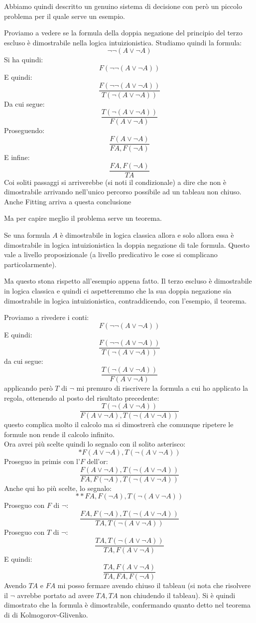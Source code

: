 \documentclass[a4paper,12pt, oneside]{book}
\begin{document}
Abbiamo quindi descritto un genuino sistema di decisione con però un piccolo
problema per il quale serve un esempio. 
\begin{esempio}
  Proviamo a vedere se la formula della doppia negazione del principio del terzo
  escluso è dimostrabile nella logica intuizionistica. Studiamo quindi la
  formula: 
  \[\neg\neg(A\lor \neg A)\]
  Si ha quindi:
  \[F(\neg\neg(A\lor \neg A))\]
  E quindi:
  \[\frac{F(\neg\neg(A\lor \neg A))}{T(\neg (A\lor \neg A))}\]
  Da cui segue:
  \[\frac{T(\neg (A\lor \neg A))}{F(A\lor \neg A)}\]
  Proseguendo:
  \[\frac{F(A\lor \neg A)}{FA, F(\neg A)}\]
  E infine:
  \[\frac{FA, F(\neg A)}{TA}\]
  Coi soliti passaggi si arriverebbe (si noti il condizionale) a dire che non è
  dimostrabile arrivando nell'unico percorso possibile ad un tableau non
  chiuso. \\
  Anche Fitting arriva a questa conclusione
\end{esempio}
Ma per capire meglio il problema serve un teorema.
\begin{teorema}
  Se una formula $A$ è dimostrabile in logica classica allora e solo allora essa
  è dimostrabile in logica intuizionistica la doppia negazione di tale
  formula. Questo vale a livello proposizionale (a livello predicativo le cose
  si complicano particolarmente). 
\end{teorema}
Ma questo stona rispetto all'esempio appena fatto. Il terzo escluso è
dimostrabile in logica classica e quindi ci aspetteremmo che la sua doppia
negazione sia dimostrabile in logica intuizionistica, contraddicendo, con
l'esempio, il teorema.
\begin{esempio}
  Proviamo a rivedere i conti:
  \[F(\neg\neg(A\lor \neg A))\]
  E quindi:
  \[\frac{F(\neg\neg(A\lor \neg A))}{T(\neg (A\lor \neg A))}\]
  da cui segue:
  \[\frac{T(\neg (A\lor \neg A))}{F(A\lor \neg A)}\]
  applicando però $T$ di $\neg$ mi premuro di riscrivere la formula a cui ho
  applicato la regola, ottenendo al posto del risultato precedente:
  \[\frac{T(\neg (A\lor \neg A))}{F(A\lor \neg A), T(\neg (A\lor \neg A))}\]
  questo complica molto il calcolo ma si dimostrerà che comunque ripetere le
  formule non rende il calcolo infinito.\\
  Ora avrei più scelte quindi lo segnalo con il solito asterisco:
  \[*F(A\lor \neg A), T(\neg (A\lor \neg A))\]
  Proseguo in primis con l'$F$ dell'or:
  \[\frac{F(A\lor \neg A), T(\neg (A\lor \neg A))}{FA, F(\neg A), T(\neg (A\lor
      \neg A))}\]
  Anche qui ho più scelte, lo segnalo:
  \[**FA, F(\neg A), T(\neg (A\lor\neg A))\]
  Proseguo con $F$ di $\neg$:
  \[\frac{FA, F(\neg A), T(\neg (A\lor\neg A))}{TA, T(\neg (A\lor\neg A))}\]
  Proseguo con $T$ di $\neg$:
  \[\frac{TA, T(\neg (A\lor\neg A))}{TA, F(A\lor\neg A)}\]
  E quindi:
  \[\frac{TA, F(A\lor\neg A)}{TA, FA, F(\neg A)}\]
  Avendo $TA$ e $FA$ mi posso fermare avendo chiuso il tableau (si nota che
  risolvere il $\neg$ avrebbe portato ad avere $TA,TA$ non chiudendo il
  tableau). Si è quindi dimostrato che la formula è dimostrabile, confermando
  quanto detto nel teorema di di Kolmogorov-Glivenko.
\end{esempio}
\end{document}
